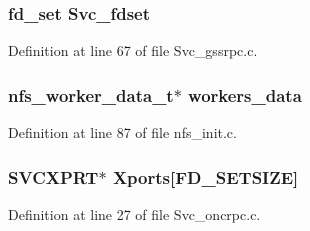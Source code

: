\subsubsection[{Svc\_\-fdset}]{\setlength{\rightskip}{0pt plus 5cm}fd\_\-set {\bf Svc\_\-fdset}}\label{nfs__rpc__dispatcher__thread_8c_a06cae25413d2604c529b04b9cef6c1e5}


Definition at line 67 of file Svc\_\-gssrpc.c.
\subsubsection[{workers\_\-data}]{\setlength{\rightskip}{0pt plus 5cm}nfs\_\-worker\_\-data\_\-t$\ast$ {\bf workers\_\-data}}\label{nfs__rpc__dispatcher__thread_8c_a4dfa2d28740c327f84868034c781f5d4}


Definition at line 87 of file nfs\_\-init.c.
\subsubsection[{Xports}]{\setlength{\rightskip}{0pt plus 5cm}SVCXPRT$\ast$ {\bf Xports}[FD\_\-SETSIZE]}\label{nfs__rpc__dispatcher__thread_8c_a9a4def18ab2df1dc6613ba45844467ae}


Definition at line 27 of file Svc\_\-oncrpc.c.